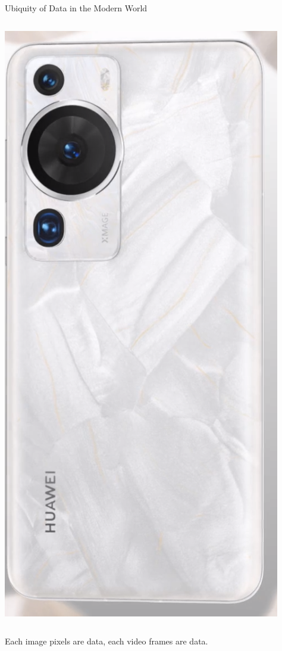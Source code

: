 \documentclass[aspectratio=169,xcolor=dvipsnames,svgnames,x11names,fleqn]{beamer}
\begin{document}
\begin{frame}{Ubiquity of Data in the Modern World}
\begin{columns}[c]
        \includegraphics[width=.8\textwidth]{figures/mobilephone.png}
    \end{columns}

    Each image pixels are data, each video frames are data. 
\end{frame}

\end{document}
